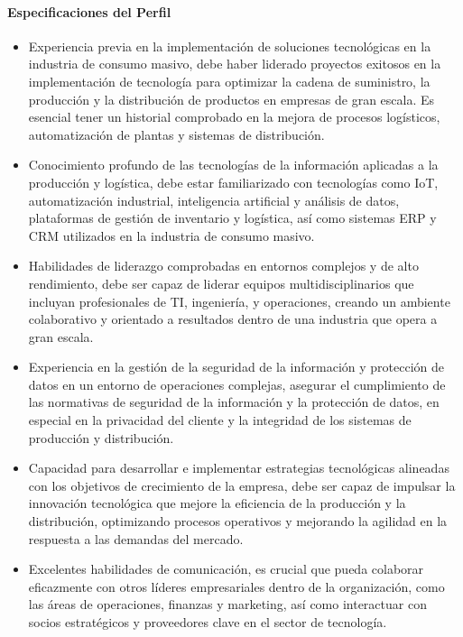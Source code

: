 \paragraph*{Especificaciones del Perfil }
    \begin{itemize}
        \item Experiencia previa en la implementación de soluciones tecnológicas en la industria de consumo masivo, debe haber liderado proyectos exitosos en la implementación de tecnología para optimizar la cadena de suministro, la producción y la distribución de productos en empresas de gran escala. Es esencial tener un historial comprobado en la mejora de procesos logísticos, automatización de plantas y sistemas de distribución. 
        \item Conocimiento profundo de las tecnologías de la información aplicadas a la producción y logística, debe estar familiarizado con tecnologías como IoT, automatización industrial, inteligencia artificial y análisis de datos, plataformas de gestión de inventario y logística, así como sistemas ERP y CRM utilizados en la industria de consumo masivo. 
        \item Habilidades de liderazgo comprobadas en entornos complejos y de alto rendimiento, debe ser capaz de liderar equipos multidisciplinarios que incluyan profesionales de TI, ingeniería, y operaciones, creando un ambiente colaborativo y orientado a resultados dentro de una industria que opera a gran escala. 
        \item Experiencia en la gestión de la seguridad de la información y protección de datos en un entorno de operaciones complejas, asegurar el cumplimiento de las normativas de seguridad de la información y la protección de datos, en especial en la privacidad del cliente y la integridad de los sistemas de producción y distribución. 
        \item Capacidad para desarrollar e implementar estrategias tecnológicas alineadas con los objetivos de crecimiento de la empresa, debe ser capaz de impulsar la innovación tecnológica que mejore la eficiencia de la producción y la distribución, optimizando procesos operativos y mejorando la agilidad en la respuesta a las demandas del mercado. 
        \item Excelentes habilidades de comunicación, es crucial que pueda colaborar eficazmente con otros líderes empresariales dentro de la organización, como las áreas de operaciones, finanzas y marketing, así como interactuar con socios estratégicos y proveedores clave en el sector de tecnología. 

\end{itemize}
